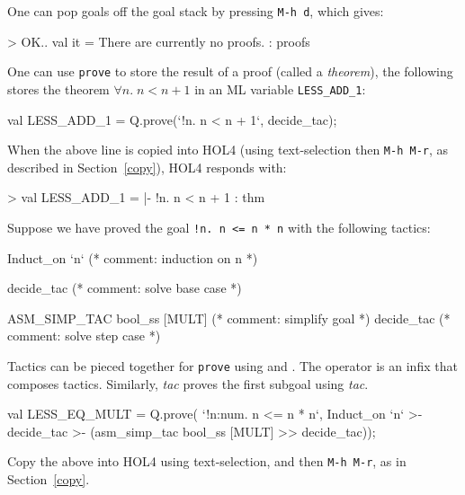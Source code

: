 \documentclass[a4paper,10pt]{article}
\begin{document}

One can pop goals off the goal stack by pressing {\tt M-h d}, which gives:
\begin{code}
> OK..
val it = There are currently no proofs. : proofs
\end{code}


One can use {\tt prove} to store the result of a proof (called a
\emph{theorem}), \eg{} the following stores the theorem $\forall n.\;n < n +
1$ in an ML variable {\tt LESS\_ADD\_1}:
\begin{code}
val LESS_ADD_1 = Q.prove(`!n. n < n + 1`, decide_tac);
\end{code}
When the above line is copied into HOL4 (using text-selection then
{\tt M-h M-r}, as described in Section~\ref{copy}), HOL4 responds with:
\begin{code}
> val LESS_ADD_1 = |- !n. n < n + 1 : thm
\end{code}


Suppose we have proved the goal {\tt \sq !n{.}~n <= n * n\sq} with the following tactics:
\begin{code}
Induct_on `n`                   (* comment: induction on n  *)

  decide_tac                    (* comment: solve base case *)

  ASM_SIMP_TAC bool_ss [MULT]   (* comment: simplify goal   *)
  decide_tac                    (* comment: solve step case *)
\end{code}
Tactics can be pieced together for {\tt prove} using \ml{\gt\gt} and \ml{\gt-}. The \ml{\gt\gt} operator is an infix that composes tactics. Similarly, \ml{\gt-} \emph{tac} proves the first subgoal using \emph{tac}.
\begin{code}
val LESS_EQ_MULT = Q.prove(
  `!n:num. n <= n * n`,
  Induct_on `n`
  >- decide_tac
  >- (asm_simp_tac bool_ss [MULT]
      >> decide_tac));
\end{code}
Copy the above into HOL4 using text-selection, and then {\tt M-h M-r}, as in Section~\ref{copy}.

\newcommand{\itemz}[2]{\texttt{#1}\; &-\;\; \textrm{#2}}
\newcommand{\itemy}[2]{#1&\quad\quad&#2\\}
\end{document}
